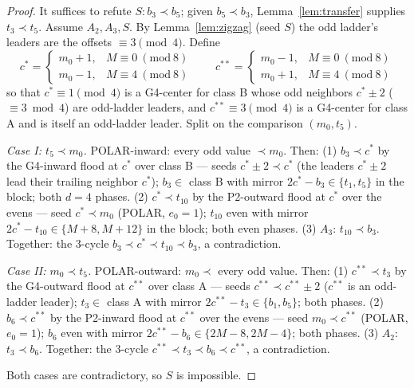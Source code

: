 \documentclass[11pt]{article}
\theoremstyle{definition}
\begin{document}
\begin{proof}
It suffices to refute $S\colon b_3 \prec b_5$; given $b_5 \prec b_3$,
Lemma~\ref{lem:transfer} supplies $t_3 \prec t_5$. Assume $A_2, A_3,
S$. By Lemma~\ref{lem:zigzag} (seed $S$) the odd ladder's leaders are
the offsets $\equiv 3 \pmod 4$. Define
\[
c^{*} =
\begin{cases} m_0 + 1, & M \equiv 0 \ (\mathrm{mod}\ 8)\\
m_0 - 1, & M \equiv 4 \ (\mathrm{mod}\ 8)\end{cases}
\qquad
c^{**} =
\begin{cases} m_0 - 1, & M \equiv 0 \ (\mathrm{mod}\ 8)\\
m_0 + 1, & M \equiv 4 \ (\mathrm{mod}\ 8)\end{cases}
\]
so that $c^{*} \equiv 1 \pmod 4$ is a G4-center for class B whose odd
neighbors $c^{*} \pm 2$ ($\equiv 3 \bmod 4$) are odd-ladder leaders,
and $c^{**} \equiv 3 \pmod 4$ is a G4-center for class A and is itself
an odd-ladder leader. Split on the comparison $(m_0, t_5)$.

\emph{Case I: $t_5 \prec m_0$.} POLAR-inward: every odd value
$\prec m_0$. Then:
(1) $b_3 \prec c^{*}$ by the G4-inward flood at $c^{*}$ over class B
--- seeds $c^{*} \pm 2 \prec c^{*}$ (the leaders $c^{*} \pm 2$ lead
their trailing neighbor $c^{*}$); $b_3 \in$ class B with mirror
$2c^{*} - b_3 \in \{t_1, t_5\}$ in the block; both $d{=}4$ phases.
(2) $c^{*} \prec t_{10}$ by the P2-outward flood at $c^{*}$ over the
evens --- seed $c^{*} \prec m_0$ (POLAR, $e_0 = 1$); $t_{10}$ even
with mirror $2c^{*} - t_{10} \in \{M{+}8, M{+}12\}$ in the block; both
even phases.
(3) $A_3$: $t_{10} \prec b_3$. Together: the $3$-cycle
$b_3 \prec c^{*} \prec t_{10} \prec b_3$, a contradiction.

\emph{Case II: $m_0 \prec t_5$.} POLAR-outward: $m_0 \prec$ every odd
value. Then:
(1) $c^{**} \prec t_3$ by the G4-outward flood at $c^{**}$ over class
A --- seeds $c^{**} \prec c^{**} \pm 2$ ($c^{**}$ is an odd-ladder
leader); $t_3 \in$ class A with mirror $2c^{**} - t_3 \in
\{b_1, b_5\}$; both phases.
(2) $b_6 \prec c^{**}$ by the P2-inward flood at $c^{**}$ over the
evens --- seed $m_0 \prec c^{**}$ (POLAR, $e_0 = 1$); $b_6$ even with
mirror $2c^{**} - b_6 \in \{2M{-}8, 2M{-}4\}$; both phases.
(3) $A_2$: $t_3 \prec b_6$. Together: the $3$-cycle
$c^{**} \prec t_3 \prec b_6 \prec c^{**}$, a contradiction.

Both cases are contradictory, so $S$ is impossible.
\end{proof}
\end{document}
